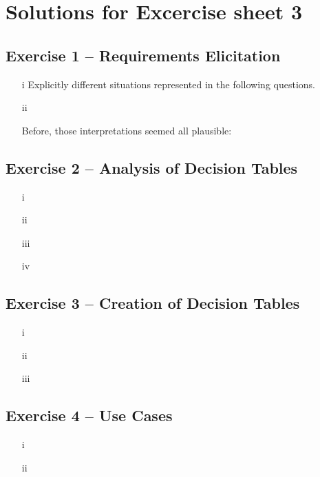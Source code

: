 \documentclass{scrartcl}
\begin{document}
\section*{Solutions for Excercise sheet 3}

\subsection*{Exercise 1 – Requirements Elicitation}
\begin{itemize}
    \item[i] Explicitly different situations represented in the following questions. \\
    \item[ii]
        
        Before, those interpretations seemed all plausible:
        
\end{itemize}



\subsection*{Exercise 2 – Analysis of Decision Tables}

\begin{itemize}
    \item[i]
    \item[ii]
    \item[iii]
    \item[iv]
\end{itemize}

\subsection*{Exercise 3 – Creation of Decision Tables}

\begin{itemize}
    \item[i]
    \item[ii]
    \item[iii]
\end{itemize}
\subsection*{Exercise 4 – Use Cases}

\begin{itemize}
    \item[i]
    \item[ii]
\end{itemize}
\end{document}
